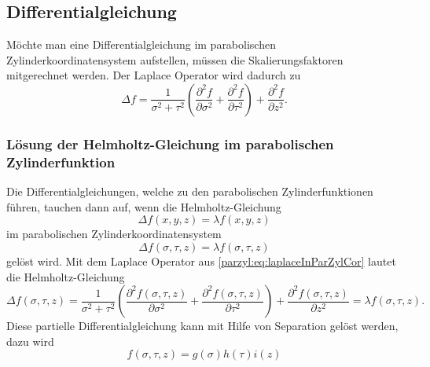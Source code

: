 \subsection{Differentialgleichung}
Möchte man eine Differentialgleichung im parabolischen 
Zylinderkoordinatensystem aufstellen, müssen die Skalierungsfaktoren
mitgerechnet werden.
Der Laplace Operator wird dadurch zu
\begin{equation}
    \Delta f = \frac{1}{\sigma^2 + \tau^2} 
        \left( 
            \frac{\partial^2 f}{\partial \sigma ^2} +
            \frac{\partial^2 f}{\partial \tau ^2}
        \right)
        + \frac{\partial^2 f}{\partial z^2}.
    \label{parzyl:eq:laplaceInParZylCor}
\end{equation}
\subsubsection{Lösung der Helmholtz-Gleichung im parabolischen Zylinderfunktion}
Die Differentialgleichungen, welche zu den parabolischen Zylinderfunktionen führen, tauchen
dann auf, wenn die Helmholtz-Gleichung
\begin{equation}
	\Delta f(x,y,z) = \lambda f(x,y,z) 
\end{equation}
im parabolischen Zylinderkoordinatensystem
\begin{equation}
	\Delta f(\sigma,\tau,z) = \lambda f(\sigma,\tau,z) 
\end{equation}
gelöst wird.
Mit dem Laplace Operator aus \eqref{parzyl:eq:laplaceInParZylCor} lautet die Helmholtz-Gleichung
\begin{equation}
	\Delta f(\sigma, \tau, z)
	=
	\frac{1}{\sigma^2 + \tau^2}
	\left ( 
	\frac{\partial^2 f(\sigma,\tau,z)}{\partial \sigma^2} 
	+ 
	\frac{\partial^2 f(\sigma,\tau,z)}{\partial \tau^2}
	\right )
	+ 
	\frac{\partial^2 f(\sigma,\tau,z)}{\partial z^2}
	= 
	\lambda f(\sigma,\tau,z).
\end{equation}
Diese partielle Differentialgleichung kann mit Hilfe von Separation gelöst werden, dazu wird 
\begin{equation}
	f(\sigma,\tau,z) = g(\sigma)h(\tau)i(z)
\end{equation}
